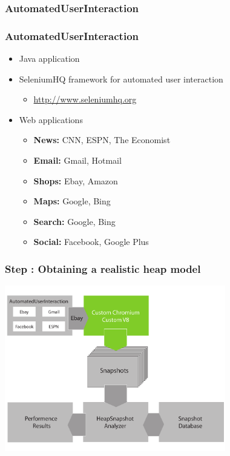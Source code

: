 \subsubsection{AutomatedUserInteraction}
\begin{frame}
	\frametitle{AutomatedUserInteraction}
	\begin{itemize}
		\item Java application
		\item SeleniumHQ framework for automated user interaction
		\begin{itemize}
			\item \href{http://www.seleniumhq.org/}{http://www.seleniumhq.org}
		\end{itemize}
		\item Web applications
		\begin{itemize}
			\item \textbf{News:} CNN, ESPN, The Economist
			\item \textbf{Email:} Gmail, Hotmail
			\item \textbf{Shops:} Ebay, Amazon
			\item \textbf{Maps:} Google, Bing
			\item \textbf{Search:} Google, Bing
			\item \textbf{Social:} Facebook, Google Plus
		\end{itemize}
	\end{itemize}
\end{frame}
	
\begin{frame}
	\frametitle{Step \theStepCounter: Obtaining a realistic heap model}		
	\includegraphics[width=26em]{../imgs/solution_h_2.pdf}
\end{frame}

